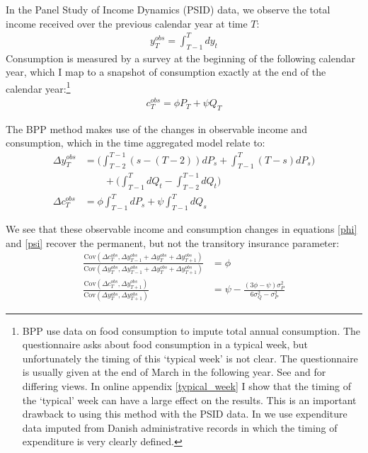 \documentclass[AER]{AEA}
\begin{document}
In the Panel Study of Income Dynamics (PSID) data, we observe the total income received over the previous calendar year at time $T$:
\begin{align*}
y^{obs}_T = \int_{T-1}^{T} dy_t
\end{align*}
Consumption is measured by a survey at the beginning of the following calendar year, which I map to a snapshot of consumption exactly at the end of the calendar year:\footnote{BPP use data on food consumption to impute total annual consumption. The questionnaire asks about food consumption in a typical week, but unfortunately the timing of this `typical week' is not clear. The questionnaire is usually given at the end of March in the following year. See \cite{altonji_testing_1987} and \cite{hall_sensitivity_1982} for differing views. In online appendix \ref{typical_week} I show that the timing of the `typical' week can have a large effect on the results. This is an important drawback to using this method with the PSID data. In \cite{crawley_consumption_2018} we use expenditure data imputed from Danish administrative records in which the timing of expenditure is very clearly defined.}
\begin{align}
c^{obs}_T = \phi P_T  +\psi Q_T \label{c_obs}
\end{align}

The BPP method makes use of the changes in observable income and consumption, which in the time aggregated model relate to:
\begin{align}
\Delta y^{obs}_T &=  \Big(\int_{T-2}^{T-1} (s-(T-2))dP_s  + \int_{T-1}^{T} (T-s)dP_s \Big) \nonumber \\
& \qquad + \Big(\int_{T-1}^{T} dQ_t -\int_{T-2}^{T-1} dQ_t \Big) \label{deltay} \\
\Delta c^{obs}_T &= \phi  \int_{T-1}^{T} dP_s  +\psi \int_{T-1}^{T}dQ_s  \label{deltac}
\end{align}

We see that these observable income and consumption changes in equations \ref{phi} and \ref{psi} recover the permanent, but not the transitory insurance parameter:
\begin{align}
\frac{\mathrm{Cov}(\Delta c^{obs}_{T}, \Delta y^{obs}_{T-1}+\Delta y^{obs}_{T}+\Delta y^{obs}_{T+1})}{\mathrm{Cov}(\Delta y^{obs}_{T}, \Delta y^{obs}_{T-1}+\Delta y^{obs}_{T}+\Delta y^{obs}_{T+1})}&= \phi\\
\frac{\mathrm{Cov}(\Delta c^{obs}_{T},\Delta y^{obs}_{T+1})}{\mathrm{Cov}(\Delta y^{obs}_{T},\Delta y^{obs}_{T+1})} &= \psi - \frac{ (3\phi - \psi) \sigma^2_P}{6\sigma^2_Q-\sigma^2_P} \label{not_psi}
\end{align}
\end{document}
